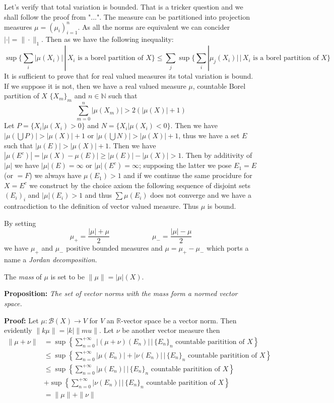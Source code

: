 \documentclass{article}
\begin{document}
\vspace{1ex}
Let's verify that total variation is bounded.
That is a tricker question and we
shall follow the proof from "...". The measure can be partitioned into projection measures
$\mu=(\mu_i)_{i=1}^n$. As all the norms are equivalent we can concider $|\cdot|
= \|\cdot\|_1$. Then as we have the following inequality:
\[\sup\{\sum_i|\mu(X_i)|\,|\,X_i\text{ is a borel partition of }X\} \leq \sum_j\sup\{\sum_i|\mu_j(X_i)|\,|\,X_i\text{ is a borel partition of }X\}\]
It is sufficient to prove that for real valued measures its total variation is bound.
If we suppose it is not, then we have a real valued measure $\mu$,
countable Borel partition of $X$ $\{X_m\}_m$ and $n\in\mathbb{N}$ such that
\[\sum_{m=0}^n|\mu(X_m)|>2(|\mu(X)|+1)\]
Let $P=\{X_i|\mu(X_i)>0\}$ and $N=\{X_i|\mu(X_i)<0\}$. Then
we have $|\mu(\bigcup P)|>|\mu(X)|+1$ or $|\mu(\bigcup N)|>|\mu(X)|+1$, thus we
have a set $E$ such that $|\mu(E)|>|\mu(X)|+1$. Then we have $|\mu(E^c)|=|\mu(X)
-\mu(E)|\geq |\mu(E)|-|\mu(X)|>1$. Then by additivity of $|\mu|$ we have
$|\mu|(E)=\infty$ or $|\mu|(E^c)=\infty$; supposing the latter we pose $E_1=E$
(or $=F$) we always have $\mu(E_1)>1$ and if we continue the same procidure for
$X=E^c$ we construct by the choice axiom the following sequence of disjoint sets
$(E_i)_i$ and $|\mu|(E_i)>1$ and thus $\sum\mu(E_i)$ does not converge and we
have a contracdiction to the definition of vector valued measure. Thus $\mu$
is bound.

\vspace{1ex}
By setting
\[\mu_+=\frac{|\mu|+\mu}{2}\quad\quad\quad\quad\quad\quad\mu_-=\frac{|\mu|-\mu}{2}\]
we have $\mu_+$ and $\mu_-$ positive bounded measures and $\mu=\mu_+-\mu_-$
which ports a name a \emph{Jordan decomposition}.


\vspace{1ex}
The \emph{mass} of $\mu$ is set to be $\|\mu\|=|\mu|(X)$.

\vspace{1ex}
\textbf{Proposition:}
\textit{The set of vector norms with the mass form a normed vector space.}

\vspace{1ex}
\textbf{Proof:} Let $\mu:\mathcal{B}(X)\rightarrow V$ for $V$ an $\mathbb
R$-vector space be a vector norm. Then evidently $\|k\mu\|=|k|\|mu\|$. Let $\nu$
be another vector measure then
\begin{align*}
    \|\mu+\nu\|&=\sup\left\{\sum_{n=0}^{+\infty}|(\mu+\nu)(E_n)|\,|\,\{E_n\}_n\text{ countable paritition of }X\right\}\\
    &\leq\sup\left\{\sum_{n=0}^{+\infty}|\mu(E_n)|+|\nu(E_n)|\,|\,\{E_n\}_n\text{ countable paritition of }X\right\}\\
    &\leq\sup\left\{\sum_{n=0}^{+\infty}|\mu(E_n)|\,|\,\{E_n\}_n\text{ countable paritition of }X\right\}\\
    &+\sup\left\{\sum_{n=0}^{+\infty}|\nu(E_n)|\,|\,\{E_n\}_n\text{ countable paritition of }X\right\}\\
    &=\|\mu\|+\|\nu\|
\end{align*}
\end{document}
